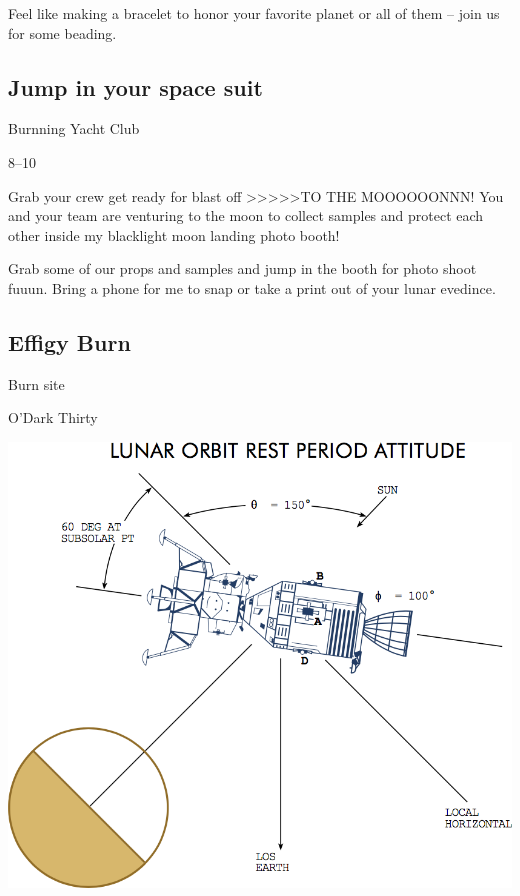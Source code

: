 \begin{multicols}{2}
Feel like making a bracelet to honor your favorite planet or all of them – join us for some beading.

\subsection*{Jump in your space suit}
\begin{description}[leftmargin=6em,noitemsep,style=nextline]
	\item[Camp:] Burnning Yacht Club
  \item[Times:] 8--10\pm
\end{description}

Grab your crew get ready for blast off >>>>>TO THE MOOOOOONNN!
You and your team are venturing to the moon to collect samples and protect each other inside my blacklight moon landing photo booth!
 
Grab some of our props and samples and jump in the booth for photo shoot fuuun. Bring a phone for me to snap or take a print out of your lunar evedince. 

\subsection*{Effigy Burn}
\begin{description}[leftmargin=6em,noitemsep,style=nextline]
	\item[Location:] Burn site
    \item[Times:] O'Dark Thirty
\end{description}

\begin{center}
	\includegraphics[width=.8\columnwidth]{images/lunarorbitrestperiod}
\end{center}


\end{multicols}
